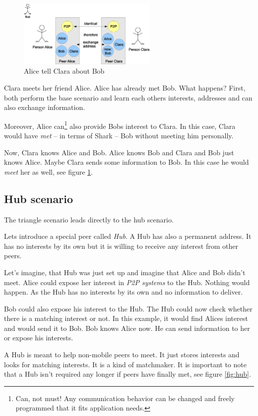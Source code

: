\begin{figure}[t]
\centering
\includegraphics[width=0.60\textwidth]{triangle.eps}
\caption{Alice tell Clara about Bob}
\label{fig:triangle}
\end{figure}

Clara meets her friend Alice. Alice has already met Bob. What happens? First, both perform the base scenario and learn each others interests, addresses and can also exchange information.

Moreover, Alice can\footnote{Can, not must! Any communication behavior can be changed and freely programmed that it fits application needs.} also provide Bobs interest to Clara. In this case, Clara would have {\it met} -- in terms of Shark -- Bob without meeting him personally.

Now, Clara knows Alice and Bob. Alice knows Bob and Clara and Bob just knows Alice. Maybe Clara sends some information to Bob. In this case he would {\it meet} her as well, see figure \ref{fig:triangle}.

\subsection{Hub scenario}
The triangle scenario leads directly to the hub scenario.

Lets introduce a special peer called {\it Hub}. A Hub has also a permanent address. It has no interests by its own but it is willing to receive any interest from other peers.

Let's imagine, that Hub was just set up and imagine that Alice and Bob didn't meet. Alice could expose her interest in {\it P2P systems} to the Hub. Nothing would happen. As the Hub has no interests by its own and no information to deliver.

Bob could also expose his interest to the Hub. The Hub could now check whether there is a matching interest or not. In this example, it would find Alices interest and would send it to Bob. Bob knows Alice now. He can send information to her or expose his interests.

A Hub is meant to help non-mobile peers to meet. It just stores interests and looks for matching interests. It is a kind of matchmaker. It is important to note that a Hub isn't required any longer if peers have finally met, see figure \ref{fig:hub}.

